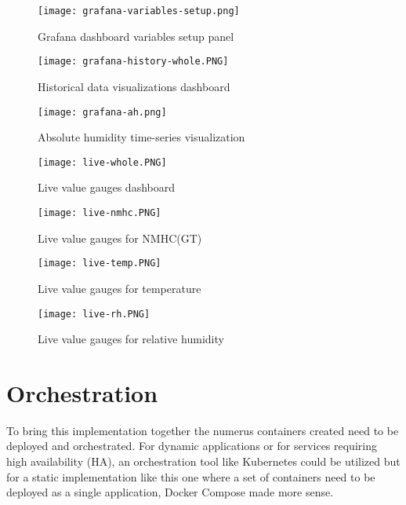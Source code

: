 \begin{figure}[!h]
    \graphicspath{ {./screenshots/} }
    \texttt{[image: grafana-variables-setup.png]}
    \centering
    \caption{Grafana dashboard variables setup panel}
    \label{fig:graf-history-whole}
\end{figure}

\begin{figure}[!h]
    \graphicspath{ {./screenshots/} }
    \texttt{[image: grafana-history-whole.PNG]}
    \centering
    \caption{Historical data visualizations dashboard}
    \label{fig:graf-history-whole}
\end{figure}

\begin{figure}[!h]
    \graphicspath{ {./screenshots/} }
    \texttt{[image: grafana-ah.png]}
    \centering
    \caption{Absolute humidity time-series visualization}
    \label{fig:graf-ah-hist}
\end{figure}

\begin{figure}[!h]
    \graphicspath{ {./screenshots/} }
    \texttt{[image: live-whole.PNG]}
    \centering
    \caption{Live value gauges dashboard}
    \label{fig:graf-live-whole}
\end{figure}

\begin{figure}[!h]
    \graphicspath{ {./screenshots/} }
    \texttt{[image: live-nmhc.PNG]}
    \centering
    \caption{Live value gauges for NMHC(GT)}
    \label{fig:graf-live-nmhc}
\end{figure}

\begin{figure}[!h]
    \graphicspath{ {./screenshots/} }
    \texttt{[image: live-temp.PNG]}
    \centering
    \caption{Live value gauges for temperature}
    \label{fig:graf-live-temp}
\end{figure}

\begin{figure}[!h]
    \graphicspath{ {./screenshots/} }
    \texttt{[image: live-rh.PNG]}
    \centering
    \caption{Live value gauges for relative humidity}
    \label{fig:graf-live-rh}
\end{figure}

\FloatBarrier
\section{Orchestration}
To bring this implementation together the numerus containers created need to be deployed and orchestrated. For dynamic applications or for services requiring high availability (HA), an orchestration tool like Kubernetes could be utilized but for a static implementation like this one where a set of containers need to be deployed as a single application, Docker Compose made more sense.

